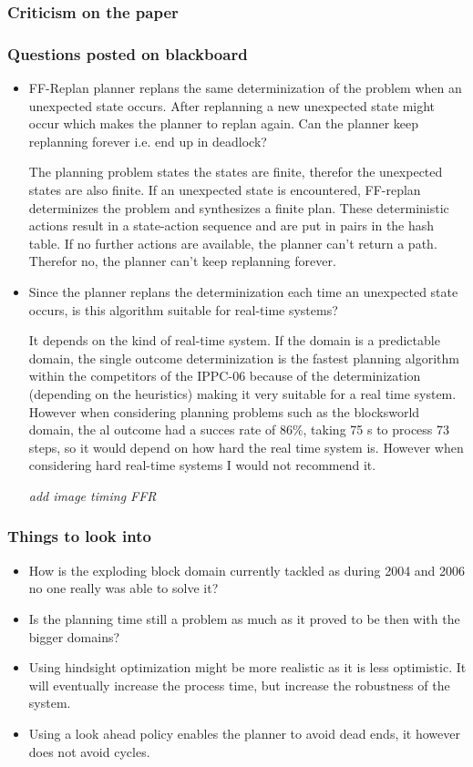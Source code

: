 \documentclass[runningheads,a4paper]{llncs}
\begin{document}
\subsubsection{Criticism on the paper}

\subsubsection{Questions posted on blackboard}
\begin{itemize}
\item FF-Replan planner replans the same determinization of the problem
when an unexpected state occurs. After replanning a new unexpected state might occur which makes the planner to replan again.
Can the planner keep replanning forever i.e. end up in deadlock?

The planning problem states the states are finite, therefor the unexpected states are also finite. If an unexpected state is encountered, FF-replan determinizes the problem and synthesizes a finite plan. These deterministic actions result in a state-action sequence and are put in pairs in the hash table. If no further actions are available, the planner can't return a path. Therefor no, the planner can't keep replanning forever. 

\item Since the planner replans the determinization each time an unexpected state occurs, is this algorithm suitable for real-time systems?

It depends on the kind of real-time system. If the domain is a predictable domain, the single outcome determinization is the fastest planning algorithm within the competitors of the IPPC-06 because of the determinization (depending on the heuristics) making it very suitable for a real time system. However when considering planning problems such as the blocksworld domain, the al outcome had a succes rate of 86\%, taking 75 s to process 73 steps, so it would depend on how hard the real time system is.  However when considering hard real-time systems I would not recommend it.  



\emph{add image timing FFR}

\end{itemize}

\subsubsection{Things to look into}
\begin{itemize}
	\item How is the exploding block domain currently tackled as during 2004 and 2006 no one really was able to solve it?
	\item Is the planning time still a problem as much as it proved to be then with the bigger domains?
	\item Using hindsight optimization might be more realistic as it is less optimistic. It will eventually increase the process time, but increase the robustness of the system.
	\item Using a look ahead policy enables the planner to avoid dead ends, it however does not avoid cycles.
\end{itemize}
\end{document}
